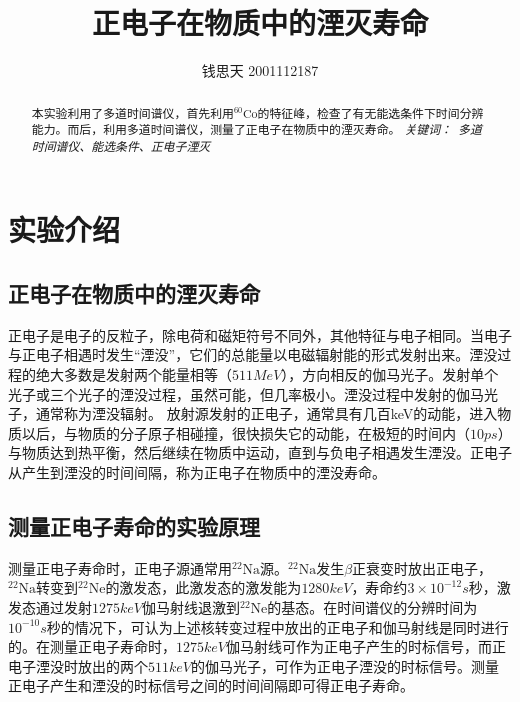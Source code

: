 \documentclass{article}
\title{正电子在物质中的湮灭寿命}
\author{钱思天 2001112187}
\begin{document}
    \maketitle
    \begin{abstract}
        本实验利用了多道时间谱仪，首先利用$^{60}\text{Co}$的特征峰，检查了有无能选条件下时间分辨能力。而后，利用多道时间谱仪，测量了正电子在物质中的湮灭寿命。
        \newline
        \newline
        {\emph{ 关键词：\ 多道时间谱仪、能选条件、正电子湮灭 }\rm}

    \end{abstract}

    \section{实验介绍}
    \subsection{正电子在物质中的湮灭寿命}
正电子是电子的反粒子，除电荷和磁矩符号不同外，其他特征与电子相同。当电子与正电子相遇时发生“湮没”，它们的总能量以电磁辐射能的形式发射出来。湮没过程的绝大多数是发射两个能量相等（$\si{511MeV}$），方向相反的伽马光子。发射单个光子或三个光子的湮没过程，虽然可能，但几率极小。湮没过程中发射的伽马光子，通常称为湮没辐射。
放射源发射的正电子，通常具有几百keV的动能，进入物质以后，与物质的分子原子相碰撞，很快损失它的动能，在极短的时间内（$\si{10ps}$）与物质达到热平衡，然后继续在物质中运动，直到与负电子相遇发生湮没。正电子从产生到湮没的时间间隔，称为正电子在物质中的湮没寿命。
   \subsection{测量正电子寿命的实验原理}
    测量正电子寿命时，正电子源通常用$^{22}\text{Na}$源。$^{22}\text{Na}$发生$\beta$正衰变时放出正电子，$^{22}\text{Na}$转变到$^{22}\text{Ne}$的激发态，此激发态的激发能为$\si{1280keV}$，寿命约$3\times10^{-12}\si{s}$秒，激发态通过发射$\si{1275keV}$伽马射线退激到$^{22}\text{Ne}$的基态。在时间谱仪的分辨时间为$10^{-10}\si{s}$秒的情况下，可认为上述核转变过程中放出的正电子和伽马射线是同时进行的。在测量正电子寿命时，$\si{1275keV}$伽马射线可作为正电子产生的时标信号，而正电子湮没时放出的两个$\si{511keV}$的伽马光子，可作为正电子湮没的时标信号。测量正电子产生和湮没的时标信号之间的时间间隔即可得正电子寿命。
\end{document}
